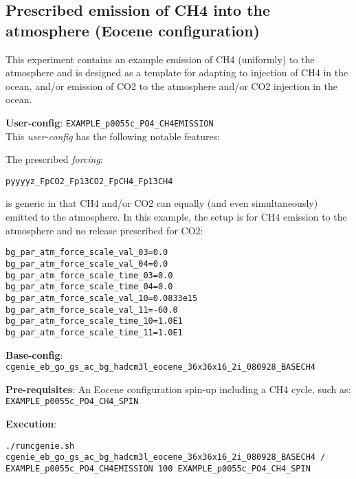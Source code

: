 \documentclass[10pt,twoside]{article}
\begin{document}
\subsection{Prescribed emission of CH4 into the atmosphere (Eocene configuration)}\label{EXAMPLE_p0055c_PO4_CH4EMISSION}

This experiment contains an example emission of CH4 (uniformly) to the atmosphere and is designed as a template for adapting to injection of CH4 in the ocean, and/or emission of CO2 to the atmosphere and/or CO2 injection in the ocean.

\noindent \textbf{User-config}: \texttt{EXAMPLE\_p0055c\_PO4\_CH4EMISSION}
\\ This \textit{user-config} has the following notable features:
\begin{compactitem}
        \item The prescribed \textit{forcing}:
\vspace{-5pt}\begin{verbatim}pyyyyz_FpCO2_Fp13CO2_FpCH4_Fp13CH4\end{verbatim}\vspace{-5pt}
        is generic in that CH4 and/or CO2 can equally (and even simultaneously) emitted to the atmosphere. In this example, the setup is for CH4 emission to the atmosphere and no release prescribed for CO2:
        \begin{verbatim}
bg_par_atm_force_scale_val_03=0.0
bg_par_atm_force_scale_val_04=0.0
bg_par_atm_force_scale_time_03=0.0
bg_par_atm_force_scale_time_04=0.0
bg_par_atm_force_scale_val_10=0.0833e15
bg_par_atm_force_scale_val_11=-60.0
bg_par_atm_force_scale_time_10=1.0E1
bg_par_atm_force_scale_time_11=1.0E1
                \end{verbatim}
\end{compactitem}

\noindent \textbf{Base-config}: \texttt{cgenie\_eb\_go\_gs\_ac\_bg\_hadcm3l\_eocene\_36x36x16\_2i\_080928\_BASECH4}

\noindent \textbf{Pre-requisites}: An Eocene configuration spin-up including a CH4 cycle, such as: \\ \texttt{EXAMPLE\_p0055c\_PO4\_CH4\_SPIN}

\noindent \textbf{Execution}:
\vspace{-5pt}\begin{verbatim}
./runcgenie.sh cgenie_eb_go_gs_ac_bg_hadcm3l_eocene_36x36x16_2i_080928_BASECH4 / 
EXAMPLE_p0055c_PO4_CH4EMISSION 100 EXAMPLE_p0055c_PO4_CH4_SPIN
                \end{verbatim}
\end{document}
